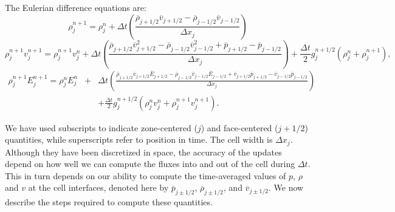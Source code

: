 The Eulerian difference equations are:
%
\newcommand{\avp}[1]{\overline{#1}_{j+1/2}}
\newcommand{\avm}[1]{\overline{#1}_{j-1/2}}
\begin{equation}
\rho_j^{n+1} = \rho_j^{n} + \Delta t \left( 
                      \frac{ \avp{\rho}\avp{v} -  \avm{\rho}\avm{v} } {\Delta x_j}
            \right)
     \label{eq:mass_diff}
\end{equation}
\begin{equation}
\rho_j^{n+1} v_{j}^{n+1} =
       \rho_j^{n+1} v_j^n  + \Delta t \left(
          \frac{ \avp{\rho} \avp{v}^2 - \avm{\rho} \avm{v}^2 + \avp{p} - \avm{p}} {\Delta x_j}
             \right)
     + \frac{ \Delta t }{2} g_j^{n+1/2} (\rho_j^n + \rho_j^{n+1}), 
     \label{eq:momentum_diff}
\end{equation}
\begin{eqnarray}
\rho_j^{n+1} E_j^{n+1}  = 
       \rho_j^n E_j^n  & + & \Delta t  \left(
            \frac{  \avp{\rho} \avp{v} \avp{E}  - \avm{\rho} \avm{v} \avm{E}  +
                       \avp{v} \avp{p}    - \avm{v} \avm{p} } {\Delta x_j}
             \right) \nonumber \\
         & & + \frac{ \Delta t }{2} g_j^{n+1/2} (\rho_j^n v_j^n + \rho_j^{n+1} v_j^{n+1} ).
     \label{eq:energy_diff}
\end{eqnarray}

We have used subscripts to indicate zone-centered ($j$) and
face-centered ($j+1/2$) quantities, while superscripts refer to
position in time.  The cell width is $\Delta x_j$.  Although they have
been discretized in space, the accuracy of the updates depend on how
well we can compute the fluxes into and out of the cell during $\Delta
t$.  This in turn depends on our ability to compute the time-averaged
values of $p$, $\rho$ and $v$ at the cell interfaces, denoted here by
$\overline{p}_{j\pm 1/2}$, $\overline{\rho}_{j\pm 1/2}$, and
$\overline{v}_{j\pm 1/2}$.  We now describe the steps required to
compute these quantities.

